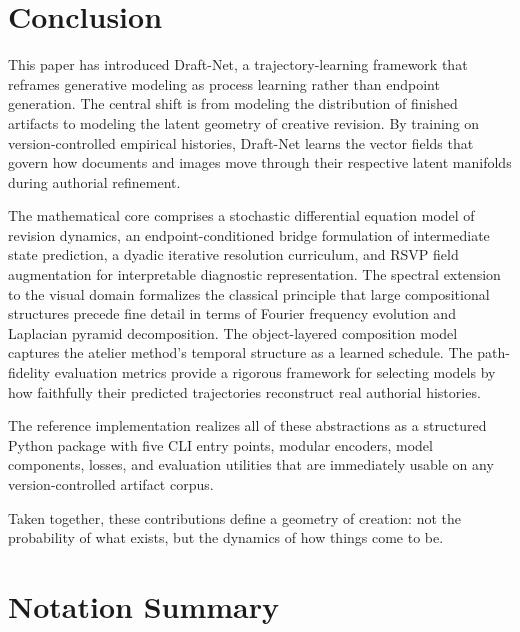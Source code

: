 \documentclass[12pt,a4paper]{article}
\theoremstyle{draftthm}
\begin{document}
\section{Conclusion}

This paper has introduced Draft-Net, a trajectory-learning framework that reframes generative modeling as process learning rather than endpoint generation. The central shift is from modeling the distribution of finished artifacts to modeling the latent geometry of creative revision. By training on version-controlled empirical histories, Draft-Net learns the vector fields that govern how documents and images move through their respective latent manifolds during authorial refinement.

The mathematical core comprises a stochastic differential equation model of revision dynamics, an endpoint-conditioned bridge formulation of intermediate state prediction, a dyadic iterative resolution curriculum, and RSVP field augmentation for interpretable diagnostic representation. The spectral extension to the visual domain formalizes the classical principle that large compositional structures precede fine detail in terms of Fourier frequency evolution and Laplacian pyramid decomposition. The object-layered composition model captures the atelier method's temporal structure as a learned schedule. The path-fidelity evaluation metrics provide a rigorous framework for selecting models by how faithfully their predicted trajectories reconstruct real authorial histories.

The reference implementation realizes all of these abstractions as a structured Python package with five CLI entry points, modular encoders, model components, losses, and evaluation utilities that are immediately usable on any version-controlled artifact corpus.

Taken together, these contributions define a geometry of creation: not the probability of what exists, but the dynamics of how things come to be.

\appendix
\section{Notation Summary}
\end{document}
